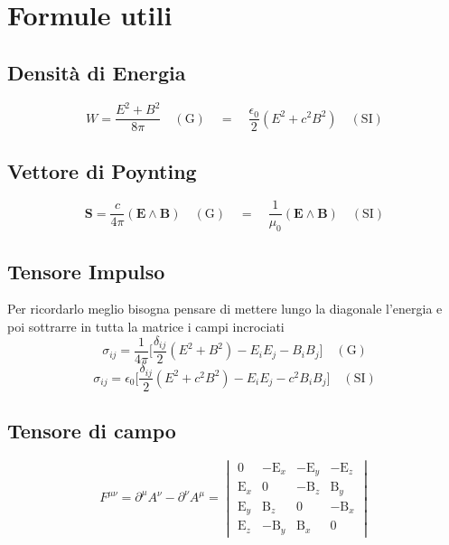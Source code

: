 \documentclass[11pt,a4paper]{report}
\newcommand{\vettore}[1]{\mathbf{#1}}
\newcommand{\vettorec}[1]{\textrm{#1}}
\newcommand{\pvet}[2]{#1\wedge #2}
\begin{document}
	\section{Formule utili}
		\subsection{Densità di Energia}
			\begin{equation}
				W=\frac{E^2+B^2}{8\pi}\quad(\textrm{G})\quad=\quad\frac{\epsilon_0}{2}(E^2+c^2B^2)\quad(\textrm{SI})
			\end{equation}
		\subsection{Vettore di Poynting}
			\begin{equation}
				\vettore S=\frac c{4\pi}(\pvet{\vettore E}{\vettore B})\quad(\textrm{G})\quad=\quad\frac{1}{\mu_0}(\pvet{\vettore E}{\vettore B})\quad(\textrm{SI})
			\end{equation}
		\subsection{Tensore Impulso}
			Per ricordarlo meglio bisogna pensare di mettere lungo la diagonale l'energia e poi sottrarre in tutta la matrice i campi incrociati
			\begin{equation}
				\sigma_{ij}=\frac 1{4\pi}\bigg[\frac{\delta_{ij}}2(E^2+B^2)-E_iE_j-B_iB_j\bigg]\quad(\textrm {G})
			\end{equation}
			\[
				\sigma_{ij}=\epsilon_0\bigg[\frac{\delta_{ij}}2(E^2+c^2B^2)-E_iE_j-c^2B_iB_j\bigg]\quad(\textrm {SI})
			\]


		\subsection{Tensore di campo}
			\begin{equation}
				F^{\mu\nu}=\partial^\mu A^\nu-\partial^\nu A^\mu=
				\begin{vmatrix}
					0 & -\vettorec E_x & -\vettorec E_y & -\vettorec E_z\\
					\vettorec E_x & 0 & -\vettorec B_z & \vettorec B_y\\
					\vettorec E_y & \vettorec B_z & 0 & -\vettorec B_x\\
					\vettorec E_z & -\vettorec B_y & \vettorec B_x & 0
				\end{vmatrix}
			\end{equation}
\end{document}
